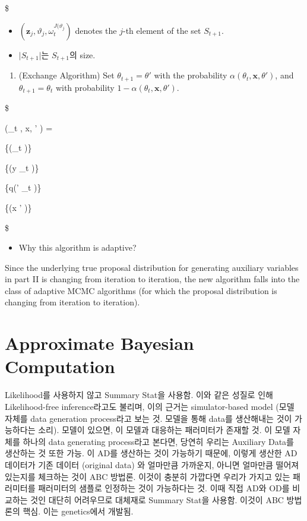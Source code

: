 \documentclass[
]{book}
\providecommand{\tightlist}{%
  \setlength{\itemsep}{0pt}\setlength{\parskip}{0pt}}
\begin{document}
\$

\begin{itemize}
\tightlist
\item
  \(\left(\pmb z_{j} , \vartheta_{j}, \omega_{t}^{J(\vartheta_{j}} \right)\) denotes the \(j\)-th element of the set \(S_{t+1}\).
\item
  \(\vert S_{t+1} \vert\)는 \(S_{t+1}\)의 size.
\end{itemize}

\begin{enumerate}
\def\labelenumi{\arabic{enumi}.}
\setcounter{enumi}{2}
\tightlist
\item
  (Exchange Algorithm) Set \(\theta_{t+1} = \theta '\) with the probability \(\alpha(\theta_t , \pmb x, \theta' )\), and \(\theta_{t+1} = \theta_{t}\) with probability \(1-\alpha(\theta_t , \pmb x, \theta' )\).
\end{enumerate}

\$

\alpha(\theta\_t , \pmb x, \theta' ) =

 \{\pi(\theta\_t )\}

 \{\varphi(\pmb y \vert \theta\_t )\}

 \{q(\theta' \vert \theta\_t )\}

 \{\varphi(\pmb x \vert \theta ' )\}

\$

\begin{itemize}
\tightlist
\item
  Why this algorithm is adaptive?
\end{itemize}

Since the underlying true proposal distribution for generating auxiliary variables in part II is changing from iteration to iteration, the new algorithm falls into the class of adaptive MCMC algorithms (for which the proposal distribution is changing from iteration to iteration).

\hypertarget{approximate-bayesian-computation}{%
\section{Approximate Bayesian Computation}\label{approximate-bayesian-computation}}

Likelihood를 사용하지 않고 Summary Stat을 사용함. 이와 같은 성질로 인해 Likelihood-free inference라고도 불리며, 이의 근거는 simulator-based model (모델 자체를 data generation process라고 보는 것. 모델을 통해 data를 생산해내는 것이 가능하다는 소리). 모델이 있으면, 이 모델과 대응하는 패러미터가 존재할 것. 이 모델 자체를 하나의 data generating process라고 본다면, 당연히 우리는 Auxiliary Data를 생산하는 것 또한 가능. 이 AD를 생산하는 것이 가능하기 때문에, 이렇게 생산한 AD 데이터가 기존 데이터 (original data) 와 얼마만큼 가까운지, 아니면 얼마만큼 떨어져 있는지를 체크하는 것이 ABC 방법론. 이것이 충분히 가깝다면 우리가 가지고 있는 패러미터를 패러미터의 샘플로 인정하는 것이 가능하다는 것. 이때 직접 AD와 OD를 비교하는 것인 대단히 어려우므로 대체재로 Summary Stat을 사용함. 이것이 ABC 방법론의 핵심. 이는 genetics에서 개발됨.
\end{document}
